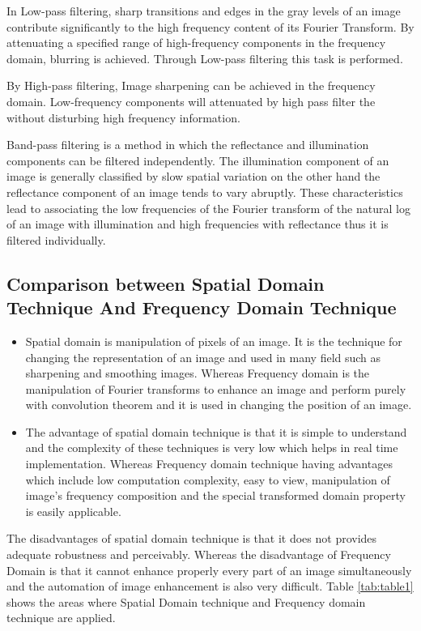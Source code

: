 In Low-pass filtering, sharp transitions and edges in the gray levels of an image contribute significantly to the high frequency content of its Fourier Transform. By attenuating a specified range of high-frequency components in the frequency domain, blurring is achieved. Through Low-pass filtering this task is performed\cite{ie1}.

By High-pass filtering, Image sharpening can be achieved in the frequency domain. Low-frequency components will attenuated by high pass filter the without disturbing high frequency information\cite{ie1}.

Band-pass filtering is a method in which the reflectance and illumination components can be filtered independently. The illumination component of an image is generally classified by slow spatial variation on the other hand the reflectance component of an image tends to vary abruptly. These characteristics lead to associating the low frequencies of the Fourier transform of the natural log of an image with illumination and high frequencies with reflectance thus it is filtered individually\cite{lime3}.

\subsection{Comparison between Spatial Domain Technique And Frequency Domain Technique}
\begin{itemize}
	\item Spatial domain is manipulation of pixels of an image. It is the technique for changing the representation of an image and used in many field such as sharpening and smoothing images. Whereas Frequency domain is the manipulation of Fourier transforms to enhance an image and perform purely with convolution theorem and it is used in changing the position of an image. 
	\item The advantage of spatial domain technique is that it is simple to understand and the complexity of these techniques is very low which helps in real time implementation. Whereas Frequency domain technique having advantages which include low computation complexity, easy to view, manipulation of image’s frequency composition and the special transformed domain property is easily applicable.
	
\end{itemize}

The disadvantages of spatial domain technique is that it does not provides adequate robustness and perceivably. Whereas the disadvantage of Frequency Domain is that it cannot enhance properly every part of an image simultaneously and the automation of image enhancement is also very difficult. Table \ref{tab:table1} shows the areas where Spatial Domain technique and Frequency domain technique are applied.

